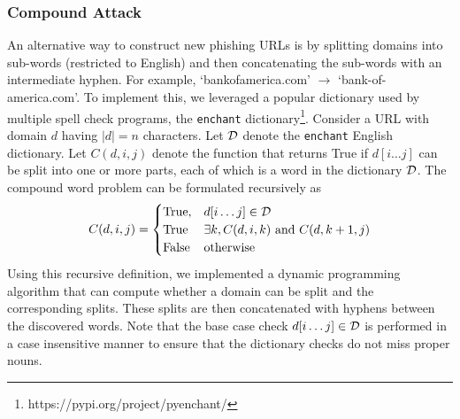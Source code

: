\subsubsection{Compound Attack}
An alternative way to construct new phishing URLs is by splitting domains into sub-words (restricted to English) and then concatenating the sub-words with an intermediate hyphen.
For example, `bankofamerica.com' $\rightarrow$ `bank-of-america.com'.
To implement this, we leveraged a popular dictionary used by multiple spell check programs, the \texttt{enchant} dictionary\footnote{https://pypi.org/project/pyenchant/}.
Consider a URL with domain $d$ having $|d| = n$ characters.
Let ${\mathcal{D}}$ denote the \texttt{enchant} English dictionary.
Let $C(d, i, j)$ denote the function that returns True if $d[i \dots j]$ can be split into one or more parts, each of which is a word in the dictionary ${\mathcal{D}}$.
The compound word problem can be formulated recursively as
\begin{align}
	C(d, i, j) =
	\begin{cases}
		\text{True}, & d[i \dots j] \in {\mathcal{D}}\\
		\text{True} & \exists k, C(d, i, k) \text{ and } C(d, k+1, j)\\
		\text{False} & \text{otherwise}
	\end{cases}
\end{align}
Using this recursive definition, we implemented a dynamic programming algorithm that can compute whether a domain can be split and the corresponding splits.
These splits are then concatenated with hyphens between the discovered words.
Note that the base case check  $d[i\dots j] \in {\mathcal{D}}$ is performed in a case insensitive manner to ensure that the dictionary checks do not miss proper nouns.

\newcommand{\permuteSys}{PermuteURL\xspace}
